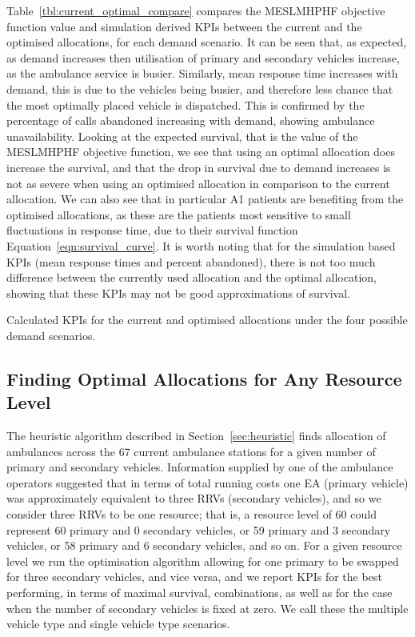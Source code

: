 \documentclass[preprint,12pt]{elsarticle}
\begin{document}
Table~\ref{tbl:current_optimal_compare} compares the MESLMHPHF objective
function value and simulation derived KPIs between the current and the optimised
allocations, for each demand scenario. It can be seen that, as expected, as
demand increases then utilisation of primary and secondary vehicles increase, as
the ambulance service is busier. Similarly, mean response time increases with
demand, this is due to the vehicles being busier, and therefore less chance that
the most optimally placed vehicle is dispatched. This is confirmed by the
percentage of calls abandoned increasing with demand, showing ambulance
unavailability.
Looking at the expected survival, that is the value of the MESLMHPHF objective
function, we see that using an optimal allocation does increase the survival,
and that the drop in survival due to demand increases is not as severe when
using an optimised allocation in comparison to the current allocation. We can
also see that in particular A1 patients are benefiting from the optimised allocations,
as these are the patients most sensitive to small fluctuations in response time,
due to their survival function Equation~\ref{eqn:survival_curve}.
It is worth noting that for the simulation based KPIs (mean response times and
percent abandoned), there is not too much
difference between the currently used allocation and the optimal allocation,
showing that these KPIs may not be good approximations of survival.

\begin{table}
\begin{center}
\resizebox{\textwidth}{!}{%
%
}
\caption{Calculated KPIs for the current and optimised allocations under the
four possible demand scenarios.}
\label{tbl:current_optimal_compare}
\end{center}
\end{table}


\subsection{Finding Optimal Allocations for Any Resource Level}\label{sec:vehicle_numbers}
The heuristic algorithm described in Section~\ref{sec:heuristic} finds
allocation of ambulances across the 67 current ambulance stations for a given
number of primary and secondary vehicles. Information supplied by one of the
ambulance operators suggested that in terms of total running costs one EA
(primary vehicle) was approximately equivalent to three RRVs (secondary
vehicles), and so we consider three RRVs to be one resource; that is, a
resource level of 60 could represent 60 primary and 0 secondary vehicles, or
59 primary and 3 secondary vehicles, or 58 primary and 6 secondary vehicles,
and so on. For a given resource level we run the optimisation algorithm allowing
for one primary to be swapped for three secondary vehicles, and vice versa,
and we report KPIs for the best performing, in terms of maximal
survival, combinations, as well as for the case when the number of secondary
vehicles is fixed at zero. We call these the multiple vehicle type and single
vehicle type scenarios.
\end{document}
